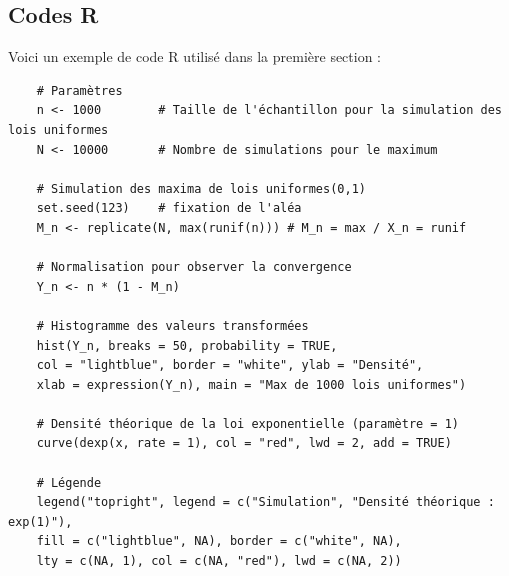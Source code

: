 \documentclass{article}
\theoremstyle{plain}
\theoremstyle{definition}
\theoremstyle{plain}
\begin{document}
\subsection{Codes R}

\noindent Voici un exemple de code R utilisé dans la première section :

\begin{lstlisting}
	# Paramètres
	n <- 1000        # Taille de l'échantillon pour la simulation des lois uniformes
	N <- 10000       # Nombre de simulations pour le maximum
	
	# Simulation des maxima de lois uniformes(0,1)
	set.seed(123)    # fixation de l'aléa
	M_n <- replicate(N, max(runif(n))) # M_n = max / X_n = runif
	
	# Normalisation pour observer la convergence
	Y_n <- n * (1 - M_n)
	
	# Histogramme des valeurs transformées
	hist(Y_n, breaks = 50, probability = TRUE, 
	col = "lightblue", border = "white", ylab = "Densité",
	xlab = expression(Y_n), main = "Max de 1000 lois uniformes")
	
	# Densité théorique de la loi exponentielle (paramètre = 1)
	curve(dexp(x, rate = 1), col = "red", lwd = 2, add = TRUE)
	
	# Légende
	legend("topright", legend = c("Simulation", "Densité théorique : exp(1)"),
	fill = c("lightblue", NA), border = c("white", NA), 
	lty = c(NA, 1), col = c(NA, "red"), lwd = c(NA, 2))
\end{lstlisting}
\end{document}
